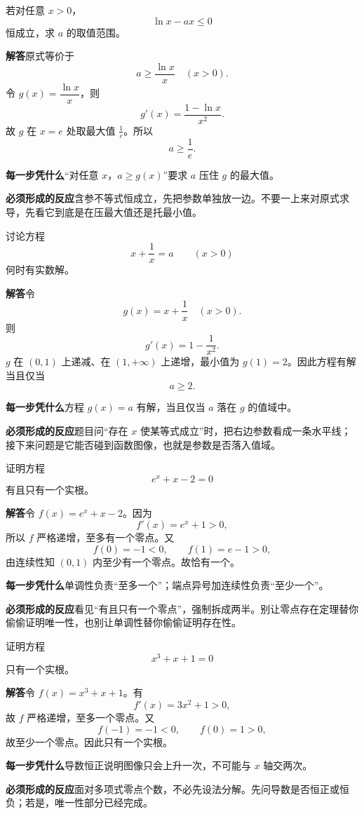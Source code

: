 \documentclass[11pt,fontset=fandol]{ctexart}
\newcommand{\answer}{\par\textbf{解答}\quad}
\newcommand{\basis}{\par\textbf{每一步凭什么}\quad}
\newcommand{\reaction}{\par\textbf{必须形成的反应}\quad}
\newenvironment{drill}[2]{
  \begin{tcolorbox}[colback=white,colframe=black!35,title={#1\quad\small #2},breakable]
}{\end{tcolorbox}}
\begin{document}
\begin{drill}{37. “恒成立”先把参数孤立}{项目导数题库恒成立题型改编}
若对任意 $x>0$，
\[
\ln x-ax\le0
\]
恒成立，求 $a$ 的取值范围。

\answer 原式等价于
\[
a\ge\frac{\ln x}{x}\quad(x>0).
\]
令 $g(x)=\dfrac{\ln x}{x}$，则
\[
g'(x)=\frac{1-\ln x}{x^2}.
\]
故 $g$ 在 $x=e$ 处取最大值 $\frac1e$。所以
\[
a\ge\frac1e.
\]

\basis “对任意 $x$，$a\ge g(x)$”要求 $a$ 压住 $g$ 的最大值。

\reaction 含参不等式恒成立，先把参数单独放一边。不要一上来对原式求导，先看它到底是在压最大值还是托最小值。
\end{drill}

\begin{drill}{38. “存在解”对应最值跨过零}{项目导数题库零点题型改编}
讨论方程
\[
x+\frac1x=a\qquad(x>0)
\]
何时有实数解。

\answer 令
\[
g(x)=x+\frac1x\quad(x>0).
\]
则
\[
g'(x)=1-\frac1{x^2}.
\]
$g$ 在 $(0,1)$ 上递减、在 $(1,+\infty)$ 上递增，最小值为 $g(1)=2$。因此方程有解当且仅当
\[
a\ge2.
\]

\basis 方程 $g(x)=a$ 有解，当且仅当 $a$ 落在 $g$ 的值域中。

\reaction 题目问“存在 $x$ 使某等式成立”时，把右边参数看成一条水平线；接下来问题是它能否碰到函数图像，也就是参数是否落入值域。
\end{drill}

\begin{drill}{39. 唯一零点要拆成存在和至多一个}{项目导数题库零点题型改编}
证明方程
\[
e^x+x-2=0
\]
有且只有一个实根。

\answer 令 $f(x)=e^x+x-2$。因为
\[
f'(x)=e^x+1>0,
\]
所以 $f$ 严格递增，至多有一个零点。又
\[
f(0)=-1<0,\qquad f(1)=e-1>0,
\]
由连续性知 $(0,1)$ 内至少有一个零点。故恰有一个。

\basis 单调性负责“至多一个”；端点异号加连续性负责“至少一个”。

\reaction 看见“有且只有一个零点”，强制拆成两半。别让零点存在定理替你偷偷证明唯一性，也别让单调性替你偷偷证明存在性。
\end{drill}

\begin{drill}{40. 导数符号能快速排除零点个数}{项目导数题库零点题型改编}
证明方程
\[
x^3+x+1=0
\]
只有一个实根。

\answer 令 $f(x)=x^3+x+1$。有
\[
f'(x)=3x^2+1>0,
\]
故 $f$ 严格递增，至多一个零点。又
\[
f(-1)=-1<0,\qquad f(0)=1>0,
\]
故至少一个零点。因此只有一个实根。

\basis 导数恒正说明图像只会上升一次，不可能与 $x$ 轴交两次。

\reaction 面对多项式零点个数，不必先设法分解。先问导数是否恒正或恒负；若是，唯一性部分已经完成。
\end{drill}
\end{document}
